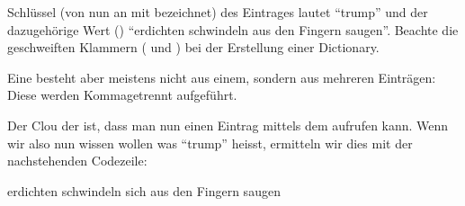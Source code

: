 \documentclass[letterpaper,10pt,english]{sphinxmanual}
\begin{document}
\begin{sphinxVerbatim}[commandchars=\\\{\}]
  
\end{sphinxVerbatim}

Schlüssel (von nun an mit  bezeichnet) des Eintrages lautet “trump” und der dazugehörige Wert () “erdichten\sphinxhyphen{} schwindeln\sphinxhyphen{} aus den Fingern saugen”. Beachte die geschweiften Klammern (\sphinxcode{\sphinxupquote{\{}} und \sphinxcode{\sphinxupquote{\}}}) bei der Erstellung einer Dictionary.

Eine  besteht aber meistens nicht aus einem, sondern aus mehreren Einträgen: Diese werden Kommagetrennt aufgeführt.

\begin{sphinxVerbatim}[commandchars=\\\{\}]
   
\end{sphinxVerbatim}

Der Clou der  ist, dass man nun einen Eintrag mittels dem  aufrufen kann. Wenn wir also nun wissen wollen was “trump” heisst, ermitteln wir dies mit der nachstehenden Codezeile:

\begin{sphinxVerbatim}[commandchars=\\\{\}]
\PYG{p}{[}\PYG{p}{]}
\end{sphinxVerbatim}

\begin{sphinxVerbatim}[commandchars=\\\{\}]
\PYGZsq{}erdichten\PYGZhy{} schwindeln\PYGZhy{} sich aus den Fingern saugen\PYGZsq{}
\end{sphinxVerbatim}
\end{document}
